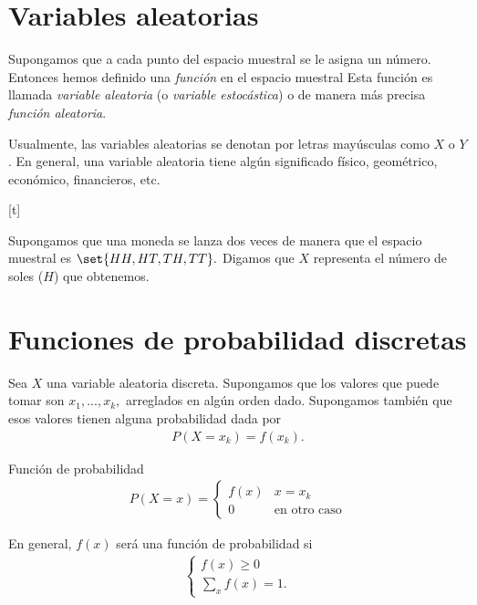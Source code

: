 

\tableofcontents


\section{Variables aleatorias}

Supongamos que a cada punto del espacio muestral se le asigna un número.  Entonces hemos definido una \emph{función} en el espacio muestral  Esta función es llamada \emph{variable aleatoria} (o \emph{variable estocástica}) o de manera más precisa \emph{función aleatoria}. 


Usualmente, las variables aleatorias se denotan por letras mayúsculas como $X$ o $Y$. En general, una variable aleatoria tiene algún significado físico, geométrico, económico, financieros, etc.


[t]
\begin{exmp}
  \label{exmp:2.1}
Supongamos que una moneda se lanza dos veces de manera que el espacio muestral es $\set{HH,HT,TH,TT}.$  Digamos que $X$ representa el número de soles ($H$) que obtenemos.
\end{exmp}


\section{Funciones de probabilidad discretas}

 Sea $X$ una variable aleatoria discreta.  Supongamos que los valores que puede tomar son $x_{1},...,x_{k},$ arreglados en algún orden dado.  Supongamos también que esos valores
 tienen alguna probabilidad dada por
 \begin{align}
 \label{2.1}
 	P(X=x_{k})=f(x_{k}).
 \end{align}


{Función de probabilidad}
\begin{align}
\label{2.2}
P(X=x)=
\begin{cases}
f(x) & x=x_{k} \\
0	& \text{en otro caso}
\end{cases}
\end{align}



	En general, $f(x)$ será una función de probabilidad si
	\begin{align*}
		\begin{cases}
			f(x)\geq 0 \\
			\sum_{x}f(x)=1.
		\end{cases}
	\end{align*}



